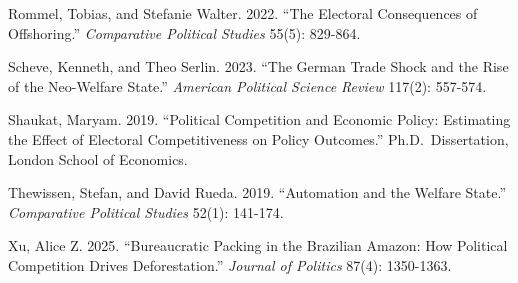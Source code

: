 \documentclass[
]{article}
\begin{document}
Rommel, Tobias, and Stefanie Walter. 2022. ``The Electoral Consequences of Offshoring.'' \emph{Comparative Political Studies} 55(5): 829-864.

Scheve, Kenneth, and Theo Serlin. 2023. ``The German Trade Shock and the Rise of the Neo-Welfare State.'' \emph{American Political Science Review} 117(2): 557-574.

Shaukat, Maryam. 2019. ``Political Competition and Economic Policy: Estimating the Effect of Electoral Competitiveness on Policy Outcomes.'' Ph.D.~Dissertation, London School of Economics.

Thewissen, Stefan, and David Rueda. 2019. ``Automation and the Welfare State.'' \emph{Comparative Political Studies} 52(1): 141-174.

Xu, Alice Z. 2025. ``Bureaucratic Packing in the Brazilian Amazon: How Political Competition Drives Deforestation.'' \emph{Journal of Politics} 87(4): 1350-1363.
\end{document}
